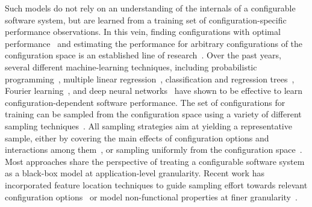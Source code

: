 Such models do not rely on an understanding of the internals of a configurable software system, but are learned from a training set of configuration-specific performance observations. In this vein, finding configurations with optimal performance~\cite{chen_mmo_2021,nairUsingBadLearners2017,nairFlash18,ohFindingNearoptimalConfigurations2017} and estimating the performance for arbitrary configurations of the configuration space is an established line of research~\cite{dorn2020,siegmundPerformanceinfluenceModelsHighly2015,haDeepPerf2019,perfAL,guoVariabilityawarePerformancePrediction2013,sarkarCostEfficientSamplingPerformance,guo_2018_data,fourier_learning_2015,perLasso,chen_hinnperf_2022}.
Over the past years, several different machine-learning techniques, including probabilistic programming~\cite{dorn2020}, multiple linear regression~\cite{siegmundPerformanceinfluenceModelsHighly2015}, classification and regression trees~\cite{guoVariabilityawarePerformancePrediction2013,sarkarCostEfficientSamplingPerformance,guo_2018_data}, Fourier learning~\cite{fourier_learning_2015,perLasso}, and deep neural networks~\cite{haDeepPerf2019,perfAL,chen_hinnperf_2022} have shown to be effective to learn configuration-dependent software performance.
The set of configurations for training can be sampled from the configuration space using a variety of different sampling techniques~\cite{kaltenecker_interplay_2020}. All sampling strategies aim at yielding a representative sample, either by covering the main effects of configuration options and interactions among them~\cite{siegmundPredictingPerformanceAutomated2012}, or sampling uniformly from the configuration space~\cite{ohFindingNearoptimalConfigurations2017,kaltenecker_distance-based_2019}.
Most approaches share the perspective of treating a configurable software system as a black-box model at application-level granularity. Recent work has incorporated feature location techniques to guide sampling effort towards relevant configuration options~\cite{velez_2020_configcrusher_jase,velez_comprex_2021} or model non-functional properties at finer granularity~\cite{weber_white_2021,han_confprof_2021}.

